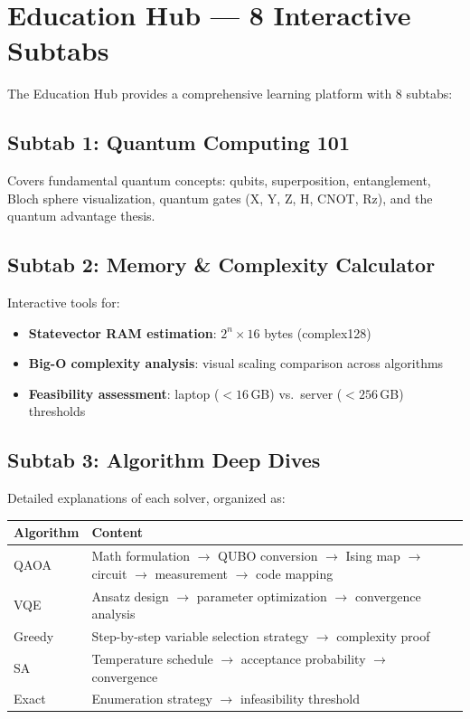 \documentclass[11pt,a4paper]{article}
\begin{document}
\section{Education Hub — 8 Interactive Subtabs}

The Education Hub provides a comprehensive learning platform with 8 subtabs:

\subsection{Subtab 1: Quantum Computing 101}

Covers fundamental quantum concepts: qubits, superposition, entanglement, Bloch sphere visualization, quantum gates (X, Y, Z, H, CNOT, Rz), and the quantum advantage thesis.

\subsection{Subtab 2: Memory \& Complexity Calculator}

Interactive tools for:
\begin{itemize}
  \item \textbf{Statevector RAM estimation}: $2^n \times 16$ bytes (complex128)
  \item \textbf{Big-O complexity analysis}: visual scaling comparison across algorithms
  \item \textbf{Feasibility assessment}: laptop ($<16$\,GB) vs.\ server ($<256$\,GB) thresholds
\end{itemize}

\subsection{Subtab 3: Algorithm Deep Dives}

Detailed explanations of each solver, organized as:
\begin{center}
\begin{tabularx}{\textwidth}{lX}
  \toprule
  \textbf{Algorithm} & \textbf{Content} \\
  \midrule
  QAOA & Math formulation $\to$ QUBO conversion $\to$ Ising map $\to$ circuit $\to$ measurement $\to$ code mapping \\
  VQE & Ansatz design $\to$ parameter optimization $\to$ convergence analysis \\
  Greedy & Step-by-step variable selection strategy $\to$ complexity proof \\
  SA & Temperature schedule $\to$ acceptance probability $\to$ convergence \\
  Exact & Enumeration strategy $\to$ infeasibility threshold \\
  \bottomrule
\end{tabularx}
\end{center}
\end{document}
